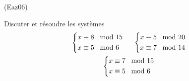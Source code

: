 \begin{tiny}(Eaz06)\end{tiny} Discuter et résoudre les systèmes
\begin{multline*}
 \left\lbrace 
\begin{aligned}
x\equiv 8 & \, \mod 15 \\
x\equiv 5 & \, \mod 6 
\end{aligned}
\right. 
\hspace{0.5cm}
 \left\lbrace 
\begin{aligned}
x\equiv 5 & \, \mod 20 \\
x\equiv 7 & \, \mod 14 
\end{aligned}
\right.  \\
 \left\lbrace 
\begin{aligned}
x\equiv 7 & \, \mod 15 \\
x\equiv 5 & \, \mod 6 
\end{aligned}
\right. 
\end{multline*}

